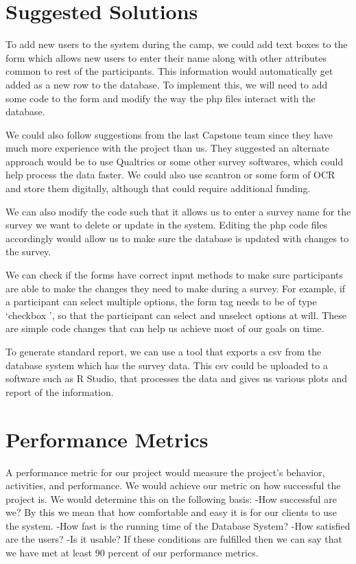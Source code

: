 \documentclass[onecolumn, draftclsnofoot,10pt, compsoc]{IEEEtran}
\begin{document}
\section{Suggested Solutions}
To add new users to the system during the camp, we could add text boxes to the form which allows new users to enter their name along with other attributes common to rest of the participants. This information would automatically get added as a new row to the database. To implement this, we will need to add some code to the form and modify the way the php files interact with the database. \newline

We could also follow suggestions from the last Capstone team since they have much more experience with the project than us. They suggested an alternate approach would be to use Qualtrics or some other survey softwares, which could help process the data faster. We could also use scantron or some form of OCR and store them digitally, although that could require additional funding.
\newline

We can also modify the code such that it allows us to enter a survey name for the survey we want to delete or update in the system. Editing the php code files accordingly would allow us to make sure the database is updated with changes to the survey. 
\newline

We can check if the forms have correct input methods to make sure participants are able to make the changes they need to make during a survey. For example, if a participant can select multiple options, the form tag needs to be of type \lq checkbox \rq, so that the participant can select and unselect options at will. These are simple code changes that can help us achieve most of our goals on time.
\newline

To generate standard report, we can use a tool that exports a csv from the database system which has the survey data. This csv could be uploaded to a software such as R Studio, that processes the data and gives us various plots and report of the information.
\newline\newline

\section{Performance Metrics}
A performance metric for our project would  measure the project's behavior, activities, and performance. We would achieve our metric on how successful the project is. We would determine this on the following basis: \newline
-How successful are we? By this we mean that how comfortable and easy it is for our clients to use the system. \newline
-How fast is the running time of the Database System? \newline
-How satisfied are the users? \newline
-Is it usable? \newline
If these conditions are fulfilled then we can say that we have met at least 90 percent of our performance metrics. \newline
\end{document}
